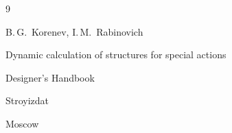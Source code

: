 \begin{thebibliography}{9}


\misctransl

\eds B.\,G.~Korenev, I.\,M.~Rabinovich

\book Dynamic calculation of structures for special actions

\bookinfo Designer's Handbook 

\publ Stroyizdat

\publaddr Moscow 





\end{thebibliography}







\hskip6.5cm \thedate \par

\hskip6.5cm\therevdate\par





\makeengtitlem



\newpage



%

%


